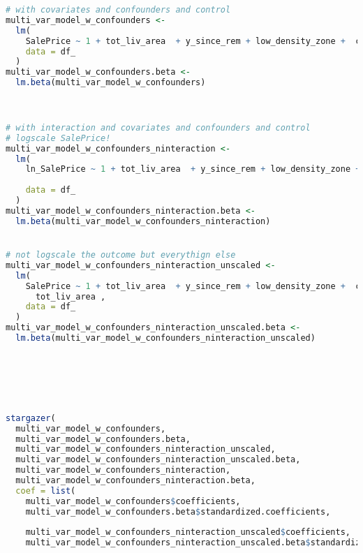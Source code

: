 \documentclass[a4paper]{article}
\begin{document}
\begin{lstlisting}[language=R]
# with covariates and confounders and control
multi_var_model_w_confounders <-
  lm(
    SalePrice ~ 1 + tot_liv_area  + y_since_rem + low_density_zone +  commercial_zone + floating_zone + LotArea + YrSold  + OverallQual_cat + Building_type,
    data = df_
  )
multi_var_model_w_confounders.beta <-
  lm.beta(multi_var_model_w_confounders)



# with interaction and covariates and confounders and control
# logscale SalePrice!
multi_var_model_w_confounders_ninteraction <-
  lm(
    ln_SalePrice ~ 1 + tot_liv_area  + y_since_rem + low_density_zone +  commercial_zone + floating_zone + I(tot_liv_area ^
                                                                                                               2) + tot_liv_area * low_density_zone + tot_liv_area * commercial_zone + tot_liv_area * floating_zone + LotArea + YrSold  + OverallQual_cat + Building_type + tot_liv_area * LotArea ,
    data = df_
  )
multi_var_model_w_confounders_ninteraction.beta <-
  lm.beta(multi_var_model_w_confounders_ninteraction)


# not logscale the outcome but everythign else
multi_var_model_w_confounders_ninteraction_unscaled <-
  lm(
    SalePrice ~ 1 + tot_liv_area  + y_since_rem + low_density_zone +  commercial_zone + floating_zone + tot_liv_area * low_density_zone + tot_liv_area * commercial_zone + tot_liv_area * floating_zone + LotArea + YrSold  + OverallQual_cat + Building_type + LotArea *
      tot_liv_area ,
    data = df_
  )
multi_var_model_w_confounders_ninteraction_unscaled.beta <-
  lm.beta(multi_var_model_w_confounders_ninteraction_unscaled)






stargazer(
  multi_var_model_w_confounders,
  multi_var_model_w_confounders.beta,
  multi_var_model_w_confounders_ninteraction_unscaled,
  multi_var_model_w_confounders_ninteraction_unscaled.beta,
  multi_var_model_w_confounders_ninteraction,
  multi_var_model_w_confounders_ninteraction.beta,
  coef = list(
    multi_var_model_w_confounders$coefficients,
    multi_var_model_w_confounders.beta$standardized.coefficients,
    
    multi_var_model_w_confounders_ninteraction_unscaled$coefficients,
    multi_var_model_w_confounders_ninteraction_unscaled.beta$standardized.coefficients,
    

\end{lstlisting}
\end{document}
